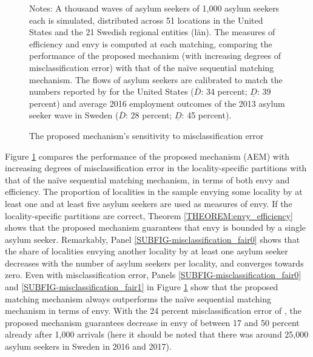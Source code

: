 \documentclass[12pt,fleqn]{article}
\begin{document}
\begin{figure}
	\caption{The proposed mechanism's sensitivity to misclassification error \label{FIG-miclassification}}
	\vspace{-0.7em}
	\vspace{-0.7em}
	\vspace{-0.7em}

	{\scriptsize \vspace{-1em}
	\begin{singlespace}
		{\sc Notes:} A thousand waves of asylum seekers of 1,000 asylum seekers each is simulated, distributed across 51 locations in the United States and the 21 Swedish regional entities (l{\"a}n). The measures of efficiency and envy is computed at each matching, comparing the performance of the proposed mechanism (with increasing degrees of misclassification error) with that of the na\"{i}ve sequential matching mechanism. The flows of asylum seekers are calibrated to match the numbers reported by \cite{bib:BansakEtAl} for the United States ($\overline{D}$: 34 percent; $\underline{D}$: 39 percent) and average 2016 employment outcomes of the 2013 asylum seeker wave in Sweden ($\overline{D}$: 28 percent; $\underline{D}$: 45 percent).
	\end{singlespace}
	 }
\end{figure}

Figure \ref{FIG-miclassification} compares the performance of the proposed mechanism (AEM) with increasing degrees of misclassification error in the locality-specific partitions with that of the na\"{i}ve sequential matching mechanism, in terms of both envy and efficiency. The proportion of localities in the sample envying some locality by at least one and at least five asylum seekers are used as measures of envy. If the locality-specific partitions are correct, Theorem \ref{THEOREM:envy_efficiency} shows that the proposed mechanism guarantees that envy is bounded by a single asylum seeker. Remarkably, Panel \ref{SUBFIG-misclassification_fair0} shows that the share of localities envying another locality by at least one asylum seeker decreases with the number of asylum seekers per locality, and converges towards zero. Even with misclassification error, Panels \ref{SUBFIG-misclassification_fair0} and \ref{SUBFIG-misclassification_fair1} in Figure \ref{FIG-miclassification} show that the proposed matching mechanism always outperforms the na\"{i}ve sequential matching mechanism in terms of envy. With the 24 percent misclassification error of \cite{bib:BansakEtAl}, the proposed mechanism guarantees decrease in envy of between 17 and 50 percent already after 1,000 arrivals (here it should be noted that there was around 25,000 asylum seekers in Sweden in 2016 and 2017).
\end{document}
